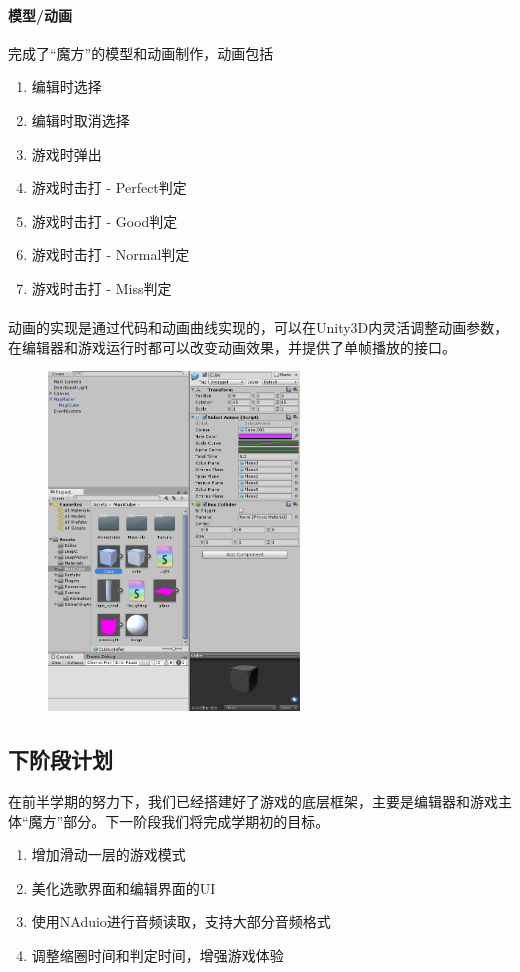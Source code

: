 \documentclass{article}
\begin{document}
\paragraph{模型/动画}
完成了“魔方”的模型和动画制作，动画包括
\begin{enumerate}
  \item 编辑时选择
  \item 编辑时取消选择
  \item 游戏时弹出
  \item 游戏时击打 - Perfect判定
  \item 游戏时击打 - Good判定
  \item 游戏时击打 - Normal判定
  \item 游戏时击打 - Miss判定
\end{enumerate}
\paragraph{}
动画的实现是通过代码和动画曲线实现的，可以在Unity3D内灵活调整动画参数，在编辑器和游戏运行时都可以改变动画效果，并提供了单帧播放的接口。
\begin{figure}[H]
  \centering
  \includegraphics[width=18em]{work1.png}\\
  \caption{}\label{}
\end{figure}
\newpage
\subsection{下阶段计划}
在前半学期的努力下，我们已经搭建好了游戏的底层框架，主要是编辑器和游戏主体“魔方”部分。下一阶段我们将完成学期初的目标。
\begin{enumerate}
  \item 增加滑动一层的游戏模式
  \item 美化选歌界面和编辑界面的UI
  \item 使用NAduio进行音频读取，支持大部分音频格式
  \item 调整缩圈时间和判定时间，增强游戏体验
\end{enumerate}
\end{document}
